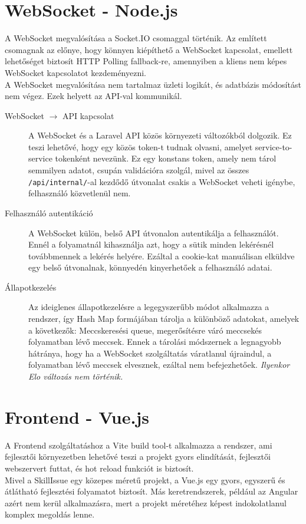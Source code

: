 \section{WebSocket - Node.js}
A WebSocket megvalósítása a Socket.IO csomaggal történik. Az említett csomagnak az előnye, hogy könnyen kiépíthető a WebSocket kapcsolat, emellett lehetőséget biztosít HTTP Polling fallback-re, amennyiben a kliens nem képes WebSocket kapcsolatot kezdeményezni.\\
A WebSocket megvalósítása nem tartalmaz üzleti logikát, és adatbázis módosítást nem végez. Ezek helyett az API-val kommunikál.

\begin{description}
    \item[WebSocket $\rightarrow$ API kapcsolat]A WebSocket és a Laravel API közös környezeti változókból dolgozik. Ez teszi lehetővé, hogy egy közös token-t tudnak olvasni, amelyet service-to-service tokenként nevezünk. Ez egy konstans token, amely nem tárol semmilyen adatot, csupán validációra szolgál, mivel az összes \texttt{/api/internal/}-al kezdődő útvonalat csakis a WebSocket veheti igénybe, felhasználó közvetlenül nem.
    \item[Felhasználó autentikáció]A WebSocket külön, belső API útvonalon autentikálja a felhasználót. Ennél a folyamatnál kihasználja azt, hogy a sütik minden lekérésnél továbbmennek a lekérés helyére. Ezáltal a cookie-kat manuálisan elküldve egy belső útvonalnak, könnyedén kinyerhetőek a felhasználó adatai.
    \item[Állapotkezelés]Az ideiglenes állapotkezelésre a legegyszerűbb módot alkalmazza a rendszer, így Hash Map formájában tárolja a különböző adatokat, amelyek a következők: Meccskeresési queue, megerősítésre váró meccsek\footnotemark és folyamatban lévő meccsek. Ennek a tárolási módszernek a legnagyobb hátránya, hogy ha a WebSocket szolgáltatás váratlanul újraindul, a folyamatban lévő meccsek elvesznek, ezáltal nem befejezhetőek. \textit{Ilyenkor Elo változás nem történik.}
\end{description}


\section{Frontend - Vue.js}
A Frontend szolgáltatáshoz a Vite build tool-t alkalmazza a rendszer, ami fejlesztői környezetben lehetővé teszi a projekt gyors elindítását, fejlesztői webszervert futtat, és hot reload funkciót is biztosít.\\
Mivel a SkillIssue egy közepes méretű projekt, a Vue.js egy gyors, egyszerű és átlátható fejlesztési folyamatot biztosít. Más keretrendszerek, például az Angular azért nem kerül alkalmazásra, mert a projekt méretéhez képest indokolatlanul komplex megoldás lenne.

